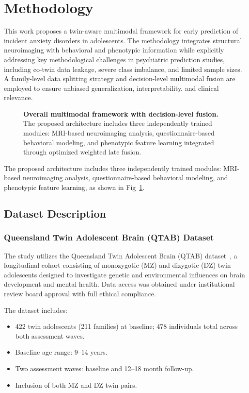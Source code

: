 \documentclass[10pt,letterpaper]{article}
\begin{document}
\section*{Methodology}

This work proposes a twin-aware multimodal framework for early prediction of incident anxiety disorders in adolescents. The methodology integrates structural neuroimaging with behavioral and phenotypic information while explicitly addressing key methodological challenges in psychiatric prediction studies, including co-twin data leakage, severe class imbalance, and limited sample sizes. A family-level data splitting strategy and decision-level multimodal fusion are employed to ensure unbiased generalization, interpretability, and clinical relevance. 

\begin{figure}[!h]
\caption{\textbf{Overall multimodal framework with decision-level fusion.}
The proposed architecture includes three independently trained modules: MRI-based neuroimaging analysis, questionnaire-based behavioral modeling, and phenotypic feature learning integrated through optimized weighted late fusion.}
\label{fig:main}
\end{figure}

The proposed architecture includes three independently trained modules: MRI-based neuroimaging analysis, questionnaire-based behavioral modeling, and phenotypic feature learning, as shown in Fig~\ref{fig:main}.

\subsection*{Dataset Description}

\subsubsection*{\textbf{Queensland Twin Adolescent Brain (QTAB) Dataset}}

The study utilizes the Queensland Twin Adolescent Brain (QTAB) dataset~\cite{ref31}, a longitudinal cohort consisting of monozygotic (MZ) and dizygotic (DZ) twin adolescents designed to investigate genetic and environmental influences on brain development and mental health. Data access was obtained under institutional review board approval with full ethical compliance.

The dataset includes:
\begin{itemize}
    \item 422 twin adolescents (211 families) at baseline; 478 individuals total across both assessment waves.
    \item Baseline age range: 9--14 years.
    \item Two assessment waves: baseline and 12--18 month follow-up.
    \item Inclusion of both MZ and DZ twin pairs.
\end{itemize}
\end{document}
